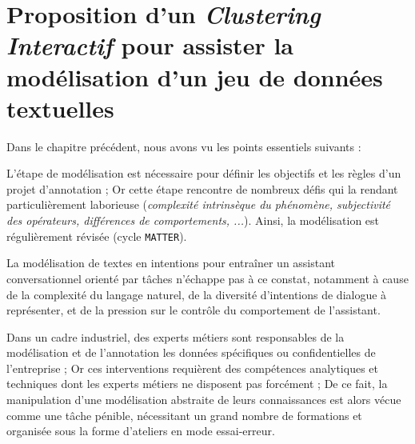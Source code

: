 \chapter{Proposition d'un \textit{Clustering Interactif} pour assister la modélisation d'un jeu de données textuelles}
\label{chapter:3-CLUSTERING-INTERACTIF}
	
	Dans le chapitre précédent, nous avons vu les points essentiels suivants :
	\begin{leftBarImportantGreen}
		\begin{todolist}
			\item[\itemok] L'étape de modélisation est nécessaire pour définir les objectifs et les règles d'un projet d'annotation ;
			Or cette étape rencontre de nombreux défis qui la rendant particulièrement laborieuse (\textit{complexité intrinsèque du phénomène, subjectivité des opérateurs, différences de comportements, ...}).
			Ainsi, la modélisation est régulièrement révisée (cycle \texttt{MATTER}).
			\item[\itemok] La modélisation de textes en intentions pour entraîner un assistant conversationnel orienté par tâches n'échappe pas à ce constat, notamment à cause de la complexité du langage naturel, de la diversité d'intentions de dialogue à représenter, et de la pression sur le contrôle du comportement de l'assistant.
			\item[\itemok] Dans un cadre industriel, des experts métiers sont responsables de la modélisation et de l'annotation les données spécifiques ou confidentielles de l'entreprise ;
			Or ces interventions requièrent des compétences analytiques et techniques dont les experts métiers ne disposent pas forcément ;
			De ce fait, la manipulation d'une modélisation abstraite de leurs connaissances est alors vécue comme une tâche pénible, nécessitant un grand nombre de formations et organisée sous la forme d'ateliers en mode essai-erreur.
		\end{todolist}
	\end{leftBarImportantGreen}
	
